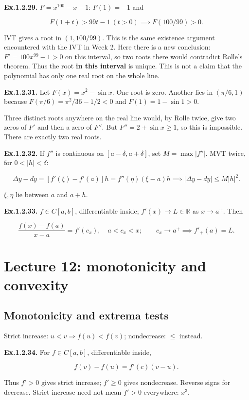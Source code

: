 \documentclass[11pt,a4paper]{article}
\begin{document}
\textbf{Ex.1.2.29.} \(F=x^{100}-x-1\): \(F(1)=-1\) and

\[
F(1+t)>99t-1\ (t>0)\implies F(100/99)>0.
\]

IVT gives a root in \((1,100/99)\). This is the same existence argument
encountered with the IVT in Week 2. Here there is a new conclusion:
\(F'=100x^{99}-1>0\) on this interval, so two roots there would
contradict Rolle's theorem. Thus the root \textbf{in this interval} is
unique. This is not a claim that the polynomial has only one real root
on the whole line.

\textbf{Ex.1.2.31.} Let \(F(x)=x^2-\sin x\). One root is zero. Another
lies in \((\pi/6,1)\) because \(F(\pi/6)=\pi^2/36-1/2<0\) and
\(F(1)=1-\sin1>0\).

Three distinct roots anywhere on the real line would, by Rolle twice,
give two zeros of \(F'\) and then a zero of \(F''\). But
\(F''=2+\sin x\ge1\), so this is impossible. There are exactly two real
roots.

\textbf{Ex.1.2.32.} If \(f''\) is continuous on \([a-\delta,a+\delta]\),
set \(M=\max|f''|\). MVT twice, for \(0<|h|<\delta\):

\[
\Delta y-dy=[f'(\xi)-f'(a)]h=f''(\eta)(\xi-a)h
\implies |\Delta y-dy|\le M|h|^2.
\]

\(\xi,\eta\) lie between \(a\) and \(a+h\).

\textbf{Ex.1.2.33.} \(f\in C[a,b]\), differentiable inside;
\(f'(x)\to L\in\mathbb R\) as \(x\to a^+\). Then

\[
\frac{f(x)-f(a)}{x-a}=f'(c_x),\quad a<c_x<x;\qquad c_x\to a^+\implies f'_+(a)=L.
\]

\section{Lecture 12: monotonicity and
convexity}\label{lecture-12-monotonicity-and-convexity}

\subsection{Monotonicity and extrema
tests}\label{monotonicity-and-extrema-tests}

Strict increase: \(u<v\Rightarrow f(u)<f(v)\); nondecrease: \(\le\)
instead.

\textbf{Ex.1.2.34.} For \(f\in C[a,b]\), differentiable inside,

\[
f(v)-f(u)=f'(c)(v-u).
\]

Thus \(f'>0\) gives strict increase; \(f'\ge0\) gives nondecrease.
Reverse signs for decrease. Strict increase need not mean \(f'>0\)
everywhere: \(x^3\).
\end{document}
